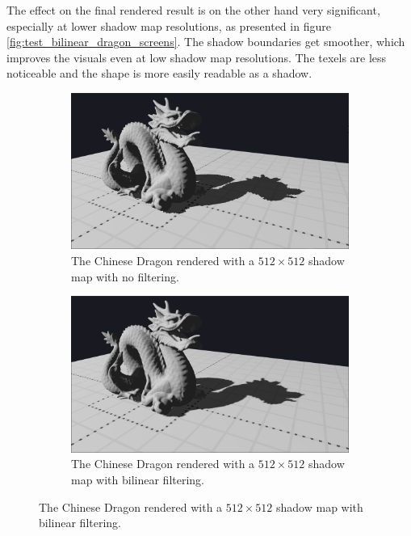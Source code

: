The effect on the final rendered result is on the other hand very significant, especially at lower shadow map resolutions, as presented in figure \ref{fig:test_bilinear_dragon_screens}. The shadow boundaries get smoother, which improves the visuals even at low shadow map resolutions. The texels are less noticeable and the shape is more easily readable as a shadow.

\begin{figure}[h]
    \centering
    \begin{subfigure}[t]{0.48\textwidth}
		\centering
        \includegraphics[width=\textwidth]{./graf/tests/basic/cropped/dragon_basic_fhd_512.png}
        \caption{The Chinese Dragon rendered with a \(512\times 512\) shadow map with no filtering.}
    \end{subfigure}
	\hfill
    \begin{subfigure}[t]{0.48\textwidth}
		\centering
        \includegraphics[width=\textwidth]{./graf/tests/bilinear/cropped/dragon_bilinear_fhd_512.png}
        \caption{The Chinese Dragon rendered with a \(512\times 512\) shadow map with bilinear filtering.}
    \end{subfigure}


\end{figure}
